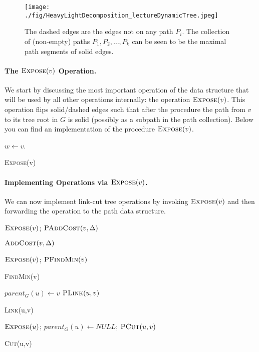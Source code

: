 \begin{figure}[!ht]
    \centering
    \texttt{[image: ./fig/HeavyLightDecomposition\_lectureDynamicTree.jpeg]}
    \caption{The dashed edges are the edges not on any path $P_i$. The collection of (non-empty) paths $P_1, P_2, \dots, P_k$ can be seen to be the maximal path segments of solid edges.}
\end{figure}

\paragraph{The $\textsc{Expose}(v)$ Operation.} We start by discussing the most important operation of the data structure that will be used by all other operations internally: the operation $\textsc{Expose}(v)$. This operation flips solid/dashed edges such that after the procedure the path from $v$ to its tree root in $G$ is solid (possibly as a subpath in the path collection). Below you can find an implementation of the procedure $\textsc{Expose}(v)$. 

\begin{algorithm}
  \SetAlgoLined
  $w \gets v$.\\
  \caption{\textsc{Expose}(v)}
\end{algorithm}

\paragraph{Implementing Operations via $\textsc{Expose}(v)$.} We can now implement link-cut tree operations by invoking $\textsc{Expose}(v)$ and then forwarding the operation to the path data structure. 
\begin{algorithm}[H]
  \SetAlgoLined
  $\textsc{Expose}(v)$; $\textsc{PAddCost}(v, \Delta)$
  \caption{$\textsc{AddCost}(v, \Delta)$}
\end{algorithm}
\begin{algorithm}[H]
  \SetAlgoLined
  $\textsc{Expose}(v)$; \Return $\textsc{PFindMin}(v)$
  \caption{\textsc{FindMin}(v)}
\end{algorithm}
\begin{algorithm}[H]
  \SetAlgoLined
  $parent_G(u) \gets v$\;
  $\textsc{PLink}(u,v)$
  \caption{\textsc{Link}(u,v)}
\end{algorithm}
\begin{algorithm}[H]
  \SetAlgoLined
  $\textsc{Expose}(u)$; $parent_G(u) \gets NULL$; $\textsc{PCut}(u,v)$\;
  \caption{\textsc{Cut}(u,v)}
\end{algorithm}

